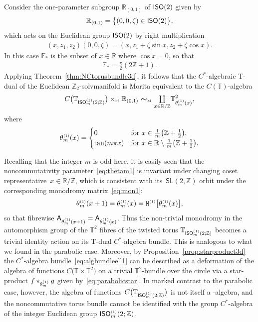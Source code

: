 \documentclass[pdftex]{sigma}
\numberwithin{equation}{section}
\newcommand{\Z}{\zed}
\newcommand{\F}{\mathbb{F}}
\newcommand{\mbf}[1]{{\boldsymbol {#1} }}
\def\A{{\sf A}}
\newcommand{\sfSL}{\mathsf{SL}}
\newcommand{\ISO}{{\sf ISO}}
\newcommand{\rt}{{\rm rt}}
\newcommand{\mcoprod}{\mbox{$\coprod\limits_{x\in\R/\Z}$}}
\newcommand{\R}{\real}
\newcommand{\zed}{{\mathbb Z}} %
\newcommand{\real}{{\mathbb R}} %
\newcommand{\torus}{{\mathbb T}} %
\begin{document}
Consider the one-parameter subgroup $\real_{(0,1)}$ of $\ISO(2)$
given by
\[
\real_{(0,1)} = \big\{(0,0,\zeta) \in \ISO(2)\big\} ,
\]
which acts on the Euclidean group $\ISO(2)$ by
right multiplication
\begin{gather*}%
(x,z_1,z_2) (0,0,\zeta) = (x,z_1+\zeta \sin x , z_2 + \zeta \cos x) .
\end{gather*}
In this case $\F_*$ is the subset of $x\in\R$ where $\cos x=0$, so that
\begin{gather}\label{eq:F*ell}
\F_* = \tfrac\pi2 (2 \Z+1) .
\end{gather}
Applying Theorem~\ref{thm:NCtorusbundle3d}, it follows that the $C^*$-algebraic T-dual of the
Euclidean $\Z_2$-solvmanifold is Morita equivalent to the
$C(\torus)$-algebra
\begin{gather}\label{eq:algbundleell1}
C\big(\torus_{\ISO^{\text{\tiny($1$)}}_m(2;\Z)}\big)\rtimes_\rt\real_{(0,1)}
\ \mbf\sim_{\text{\tiny M}} \ \mcoprod
\torus^2_{\theta^{\text{\tiny(1)}}_m(x)} ,
\end{gather}
where
\begin{gather}\label{eq:thetam1}
\theta_m^{\text{\tiny(1)}}(x) =
 \begin{cases}
 0 & \mbox{for} \ x \in \frac1{m} \big(\Z+\frac12\big) , \\
 \tan(m \pi x)
 & \mbox{for} \ x\in\R\setminus \frac1{m} \big(\Z+\frac12\big) . \end{cases}
\end{gather}

Recalling that the integer $m$ is odd here, it is easily seen that the noncommutativity para\-me\-ter~\eqref{eq:thetam1} is invariant under changing coset representative~$x\in\R/\Z$, which is consistent with its~$\sfSL(2,\Z)$ orbit under
the corresponding monodromy matrix~\eqref{eq:mon1}:
\[
\theta_m^{\text{\tiny(1)}}(x+1) = \theta_m^{\text{\tiny(1)}}(x) =
{\tt M}^{\text{\tiny(1)}}\big[\theta_m^{\text{\tiny(1)}}(x)\big],
\]
so that fibrewise $\A_{\theta^{\text{\tiny(1)}}_m(x+1)} =
\A_{\theta^{\text{\tiny(1)}}_m(x)}$. Thus the non-trivial
monodromy in the automorphism group of the $\torus^2$ fibres of the
twisted torus $\torus_{\ISO_m^{\text{\tiny(1)}}(2;\Z)}$ becomes a
trivial identity action on its T-dual $C^*$-algebra bundle.
This is analogous to what we found in the parabolic case. Moreover,
by Proposition~\ref{prop:starproduct3d} the $C^*$-algebra
bundle~\eqref{eq:algbundleell1} can be described as a deformation of the algebra of functions
$C\big(\torus\times\torus^2\big)$ on a trivial $\torus^2$-bundle over the
circle via a star-product
$f\star_{\theta_m^{\text{\tiny(1)}}}g$ given by~\eqref{eq:parabolicstar}. In marked contrast to the parabolic case, however, the algebra of
functions $C\big(\torus_{\ISO_m^{\text{\tiny(1)}}(2;\Z)}\big)$ is not itself
a \smash{$C\big(\torus^2\big)$}-algebra, and the
noncommutative torus bundle cannot be identified with the group
$C^*$-algebra of the integer Euclidean group
$\ISO_m^{\text{\tiny(1)}}(2;\Z)$.
\end{document}
